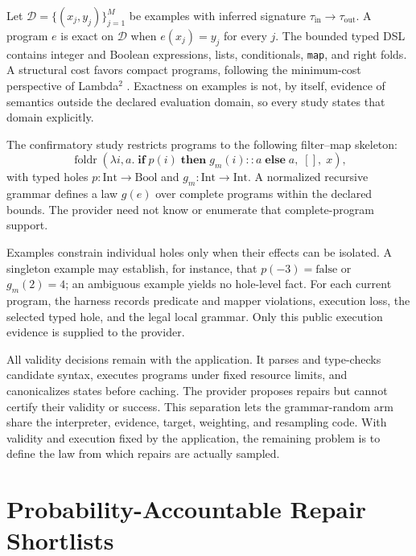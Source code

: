 \documentclass[twoside,11pt]{article}
\newcommand{\data}{\mathcal{D}}
\begin{document}
Let $\data=\{(x_j,y_j)\}_{j=1}^M$ be examples with inferred signature
$\tau_{\mathrm{in}}\rightarrow\tau_{\mathrm{out}}$. A program $e$ is exact on
$\data$ when $e(x_j)=y_j$ for every $j$. The bounded typed DSL contains integer
and Boolean expressions, lists, conditionals, \texttt{map}, and right folds. A
structural cost favors compact programs, following the minimum-cost perspective
of Lambda$^2$ \citep{feser2015datastructure}. Exactness on examples is not, by
itself, evidence of semantics outside the declared evaluation domain, so every
study states that domain explicitly.

The confirmatory study restricts programs to the following filter--map
skeleton:
\begin{equation}
\operatorname{foldr}(\lambda i,a.\;\mathbf{if}\;p(i)\;\mathbf{then}\;
g_m(i)::a\;\mathbf{else}\;a,\;[],\;x),
\label{eq:filtermap}
\end{equation}
with typed holes $p:\mathrm{Int}\rightarrow\mathrm{Bool}$ and
$g_m:\mathrm{Int}\rightarrow\mathrm{Int}$. A normalized recursive grammar
defines a law $g(e)$ over complete programs within the declared bounds. The
provider need not know or enumerate that complete-program support.

Examples constrain individual holes only when their effects can be isolated. A
singleton example may establish, for instance, that
$p(-3)=\mathrm{false}$ or $g_m(2)=4$; an ambiguous example yields no hole-level
fact. For each current program, the harness records predicate and mapper
violations, execution loss, the selected typed hole, and the legal local
grammar. Only this public execution evidence is supplied to the provider.

All validity decisions remain with the application. It parses and type-checks
candidate syntax, executes programs under fixed resource limits, and
canonicalizes states before caching. The provider proposes repairs but cannot
certify their validity or success. This separation lets the grammar-random arm
share the interpreter, evidence, target, weighting, and resampling code. With
validity and execution fixed by the application, the remaining problem is to
define the law from which repairs are actually sampled.

\section{Probability-Accountable Repair Shortlists}
\label{sec:proposal}
\end{document}
